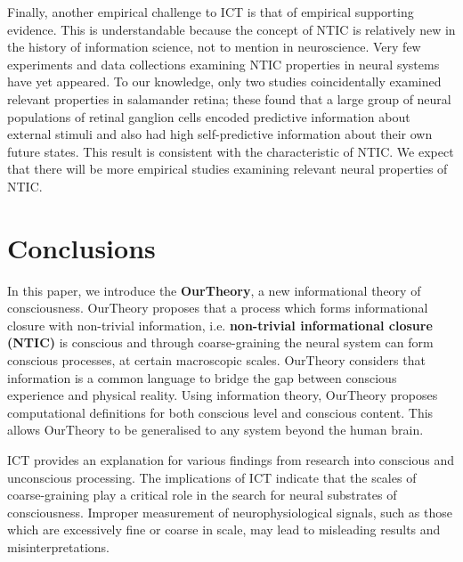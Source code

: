 \documentclass[utf8]{article}
\begin{document}
        Finally, another empirical challenge to ICT is that of empirical supporting evidence. This is understandable because the concept of NTIC is relatively new in the history of information science, not to mention in neuroscience. Very few experiments and data collections examining NTIC properties in neural systems have yet appeared. To our knowledge, only two studies \citep{Palmer2015, sederberg2018learning} coincidentally examined relevant properties in salamander retina; these found that a large group of neural populations of retinal ganglion cells encoded predictive information about external stimuli and also had high self-predictive information about their own future states. This result is consistent with the characteristic of NTIC. We expect that there will be more empirical studies examining relevant neural properties of NTIC.
        
    \section{Conclusions}
    In this paper, we introduce the \textbf{\acf{OurTheory}}, a new informational theory of consciousness. \ac{OurTheory} proposes that a process which forms informational closure with non-trivial information, i.e. \textbf{non-trivial informational closure (NTIC)} is conscious and through coarse-graining the neural system can form conscious processes, at certain macroscopic scales. \ac{OurTheory} considers that information is a common language to bridge the gap between conscious experience and physical reality. Using information theory, \ac{OurTheory} proposes computational definitions for both conscious level and conscious content. This allows \ac{OurTheory} to be generalised to any system beyond the human brain. 
    
    ICT provides an explanation for various findings from research into conscious and unconscious processing. The implications of ICT indicate that the scales of coarse-graining play a critical role in the search for neural substrates of consciousness. Improper measurement of neurophysiological signals, such as those which are excessively fine or coarse in scale, may lead to misleading results and misinterpretations.
    
\end{document}
